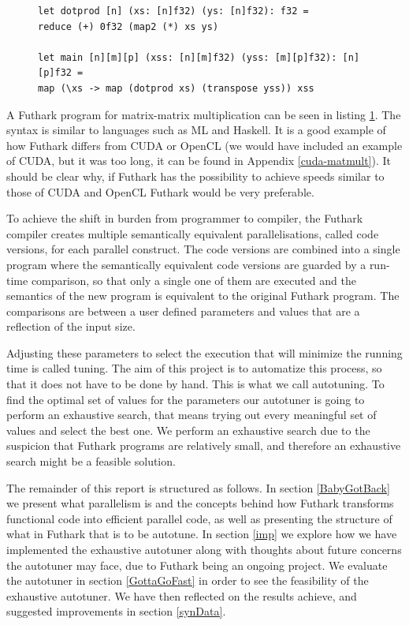 \begin{figure}
\centering
\lstset{language=haskell}
\begin{lstlisting}
let dotprod [n] (xs: [n]f32) (ys: [n]f32): f32 =
reduce (+) 0f32 (map2 (*) xs ys)

let main [n][m][p] (xss: [n][m]f32) (yss: [m][p]f32): [n][p]f32 =
map (\xs -> map (dotprod xs) (transpose yss)) xss
\end{lstlisting}%
\label{IntromatmultFuthark}
\end{figure}
A Futhark program for matrix-matrix multiplication can be seen in listing
\ref{IntromatmultFuthark}. The syntax is similar to languages such as ML and
Haskell. It is a good example of how Futhark differs from CUDA or OpenCL (we
would have included an example of CUDA, but it was too long, it can be found in Appendix
\ref{cuda-matmult}). It should be clear why, if Futhark has the possibility to
achieve speeds similar to those of CUDA and OpenCL Futhark would be very
preferable.

To achieve the shift in burden from programmer to compiler, the Futhark
compiler creates multiple semantically equivalent parallelisations, called code
versions, for each parallel construct. The code versions are combined into
a single program where the semantically equivalent code versions are guarded
by a run-time comparison, so that only a single one of them are executed and the
semantics of the new program is equivalent to the original Futhark program. 
The comparisons are between a user defined parameters and values that are
a reflection of the input size.

Adjusting these parameters to select the execution that will minimize the
running time is called tuning. The aim of this project is to automatize this
process, so that it does not have to be done by hand. This is what we
call autotuning. To find the optimal set of values for the parameters our
autotuner is going to perform an exhaustive search, that means trying out every
meaningful set of values and select the best one. 
We perform an exhaustive search
due to the suspicion that Futhark programs are relatively small, and therefore 
an exhaustive search might be a feasible solution.

The remainder of this report is structured as follows. In section \ref{BabyGotBack} 
we present what parallelism is and the concepts behind how Futhark transforms functional 
code into efficient parallel code, 
as well as presenting the structure of what in Futhark that is to be autotune. 
In section \ref{imp} we explore how we have implemented the exhaustive autotuner along
with thoughts about future concerns the autotuner may face, due to Futhark being an
ongoing project. We evaluate the autotuner in section \ref{GottaGoFast} in order to see the
feasibility of the exhaustive autotuner. We have then reflected
on the results achieve, and suggested improvements in section \ref{synData}. 

